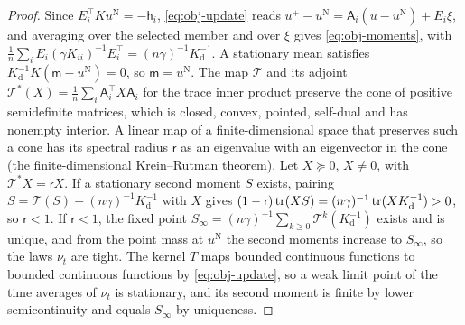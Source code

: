 \begin{proof}
Since $E_i^\top Ku^{\mathrm N}=-\mathsf h_i$, \eqref{eq:obj-update} reads $u^+-u^{\mathrm N}=\mathsf A_i(u-u^{\mathrm N})+E_i\xi$, and averaging over the selected member and over $\xi$ gives \eqref{eq:obj-moments}, with $\frac1n\sum_iE_i(\gamma K_{ii})^{-1}E_i^\top=(n\gamma)^{-1}K_{\mathrm d}^{-1}$. A stationary mean satisfies $K_{\mathrm d}^{-1}K(\mathsf m-u^{\mathrm N})=0$, so $\mathsf m=u^{\mathrm N}$. The map $\mathcal T$ and its adjoint $\mathcal T^\ast(X)=\frac1n\sum_i\mathsf A_i^\top X\mathsf A_i$ for the trace inner product preserve the cone of positive semidefinite matrices, which is closed, convex, pointed, self-dual and has nonempty interior. A linear map of a finite-dimensional space that preserves such a cone has its spectral radius $\mathsf r$ as an eigenvalue with an eigenvector in the cone (the finite-dimensional Krein--Rutman theorem). Let $X\succeq0$, $X\neq0$, with $\mathcal T^\ast X=\mathsf rX$. If a stationary second moment $S$ exists, pairing $S=\mathcal T(S)+(n\gamma)^{-1}K_{\mathrm d}^{-1}$ with $X$ gives $(1-\mathsf r)\operatorname{tr}(XS)=(n\gamma)^{-1}\operatorname{tr}(XK_{\mathrm d}^{-1})>0$, so $\mathsf r<1$. If $\mathsf r<1$, the fixed point $S_\infty=(n\gamma)^{-1}\sum_{k\ge0}\mathcal T^k(K_{\mathrm d}^{-1})$ exists and is unique, and from the point mass at $u^{\mathrm N}$ the second moments increase to $S_\infty$, so the laws $\nu_t$ are tight. The kernel $T$ maps bounded continuous functions to bounded continuous functions by \eqref{eq:obj-update}, so a weak limit point of the time averages of $\nu_t$ is stationary, and its second moment is finite by lower semicontinuity and equals $S_\infty$ by uniqueness.
\end{proof}

